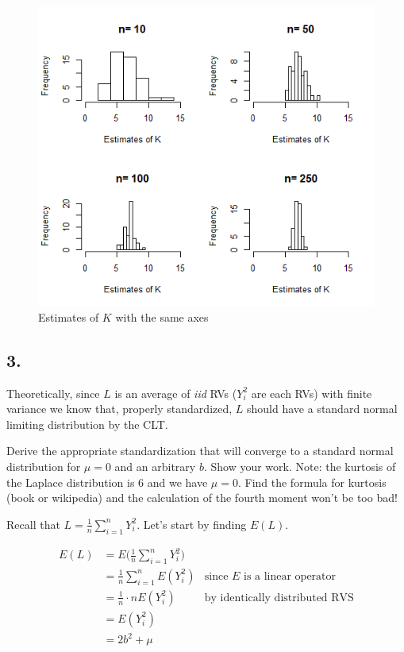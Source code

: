 \documentclass[12pt]{article}
\begin{document}
\begin{figure}[H]
	\centering
	\includegraphics[scale = 0.6]{img/problem2/Problem_2_K.png}
	\caption{Estimates of $K$ with the same axes}
\end{figure}

\subsection{3.}
Theoretically, since $L$ is an average of \textit{iid} RVs ($Y_i^2$ are each RVs) with finite variance
we know that, properly standardized, $L$ should have a standard normal limiting distribution by the CLT. 

Derive the appropriate standardization that will converge to a standard normal distribution for $\mu = 0$ and an arbitrary $b$. Show your work. Note: the kurtosis of the Laplace distribution is 6 and we have $\mu = 0$. Find the formula for kurtosis (book or
wikipedia) and the calculation of the fourth moment won’t be too bad!

\bigskip
\noindent
Recall that $L = \frac{ 1 }{ n } \sum_{i = 1}^{n} Y_i^2$. Let's start by finding $E(L)$.

\begin{align*}
	E(L) & = E \Big( \frac{ 1 }{ n } \sum_{i = 1}^{n} Y_i^2 \Big) \\
		& = \frac{ 1 }{ n } \sum_{i = 1}^{n} E(Y_i^2) & \text{since $E$ is a linear operator} \\
		& =  \frac{ 1 }{ n } \cdot n E(Y_i^2) & \text{by identically distributed RVS} \\
		& = E(Y_i^2) \\
		& = 2b^2 + \mu
\end{align*}
\end{document}

